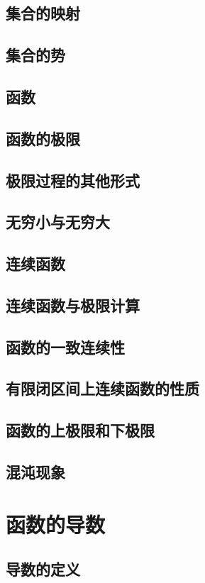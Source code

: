 \documentclass[a4paper, 11pt]{ctexbook}
\begin{document}
            \section{集合的映射}
            \section{集合的势}
            \section{函数}
            \section{函数的极限}
            \section{极限过程的其他形式}
            \section{无穷小与无穷大}
            \section{连续函数}
            \section{连续函数与极限计算}
            \section{函数的一致连续性}
            \section{有限闭区间上连续函数的性质}
            \section{函数的上极限和下极限}
            \section{混沌现象}
        \chapter{函数的导数}
            \section{导数的定义}
\end{document}
